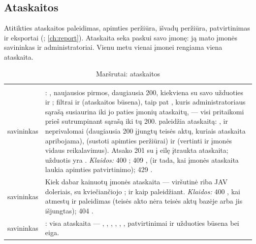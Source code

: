 \subsection{Ataskaitos}\label{sec:api:reports}

Atitikties ataskaitos paleidimas, apimties peržiūra, išvadų peržiūra, patvirtinimas ir eksportai
(; \cref{ch:report}). Ataskaita seka paskui savo įmonę: ją mato įmonės
savininkas ir administratoriai. Vienu metu vienai įmonei rengiama viena ataskaita.

\begin{xltabular}{\textwidth}{@{}L{19mm}Y@{}}
\caption{Maršrutai: ataskaitos}\label{tab:api:reports}\\
\toprule {} &  \\ \midrule \endfirsthead
\toprule {} &  \\ \midrule \endhead
\bottomrule \endlastfoot
{}
savininkas & : , naujausios pirmos, daugiausia 200, kiekviena su savo
  užduoties  ir ; filtrai  ir 
  (ataskaitos būsena), taip pat , kuris administratoriaus sąrašą susiaurina
  iki jo paties įmonių ataskaitų, --- visi pritaikomi prieš sutrumpinant sąrašą iki tų 200.  paleidžia
  ataskaitą: ,  ir neprivalomai  (daugiausia 200
  įjungtų teisės aktų, kuriais ataskaita apribojama),  (sustoti apimties peržiūrai)
  ir  (vertinti ir įmonės vidaus reikalavimus). Atsako 201 su į eilę įtraukta
  ataskaita; užduotis yra . \emph{Klaidos:} 400 ; 409
  ,  (ir tada, kai įmonės ataskaita laukia apimties
  patvirtinimo); 429 . \\
\addlinespace
{}
savininkas & Kiek dabar kainuotų įmonės  ataskaita --- viršutinė riba JAV
  doleriais, su kviečiančiojo ;  ir  kaip
  paleidžiant. \emph{Klaidos:} 400 , kai  atmestų ir
  paleidimas (teisės akto nėra teisės aktų bazėje arba jis išjungtas); 404 . \\
\addlinespace
{}
savininkas & : visa ataskaita --- , , ,
  , , , patvirtinimai ir užduoties būsena bei eiga.

\end{xltabular}
